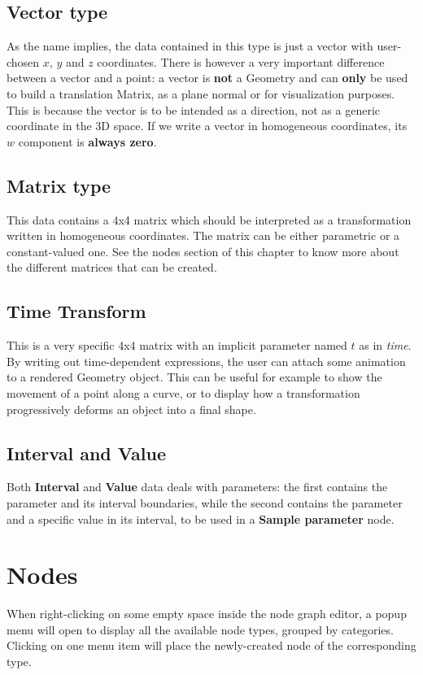 \subsection{Vector type}
As the name implies, the data contained in this type is just a vector with
user-chosen $x$, $y$ and $z$ coordinates. There is however a very important
difference between a vector and a point: a vector is \textbf{not} a Geometry and
can \textbf{only} be used to build a translation Matrix, as a plane normal or for
visualization purposes. This is because the vector is to be intended as a direction,
not as a generic coordinate in the 3D space. If we write a vector
in homogeneous coordinates, its $w$ component is \textbf{always zero}.

\subsection{Matrix type}
This data contains a 4x4 matrix which should be interpreted as a transformation written in
homogeneous coordinates. The matrix can be either parametric or a constant-valued one.
See the nodes section of this chapter to know more about the different matrices that can
be created.

\subsection{Time Transform}
This is a very specific 4x4 matrix with an implicit parameter named $t$ as in \textit{time}.
By writing out time-dependent expressions, the user can attach some animation to 
a rendered Geometry object. This can be useful for example to show the movement of a
point along a curve, or to display how a transformation progressively deforms an object
into a final shape.

\subsection{Interval and Value}
Both \textbf{Interval} and \textbf{Value} data deals with parameters: the first contains
the parameter and its interval boundaries, while the second contains the parameter and
a specific value in its interval, to be used in a \textbf{Sample parameter} node.

\section{Nodes}
When right-clicking on some empty space inside the node graph editor, a popup menu
will open to display all the available node types, grouped by categories.
Clicking on one menu item will place the newly-created node of the corresponding type.

